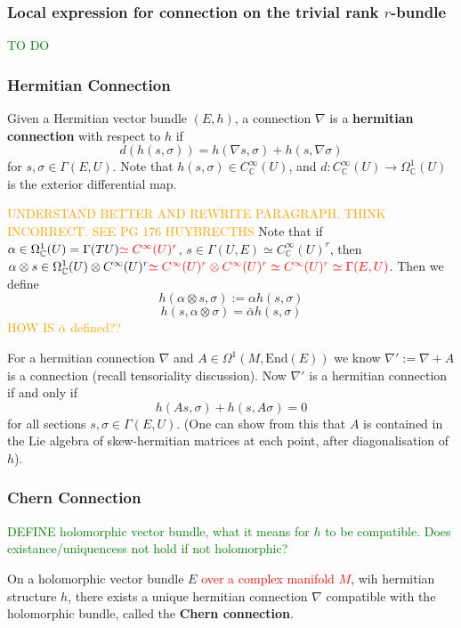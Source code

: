 \documentclass[a4paper]{article}
\theoremstyle{definition} \newtheorem*{definition}{Definition}
\theoremstyle{definition} \newtheorem*{definitions}{Definitions}
\theoremstyle{plain} \newtheorem{theorem}{Theorem}[section]
\theoremstyle{plain} \newtheorem{proposition}[theorem]{Proposition}
\theoremstyle{plain} \newtheorem{corollary}[theorem]{Corollary}
\theoremstyle{plain} \newtheorem{lemma}[theorem]{Lemma}
\theoremstyle{plain} \newtheorem{example}[theorem]{Example}
\newcommand{\checkCorrect}[1]{\textcolor{red}{#1}}
\newcommand{\understandBetter}[1]{\textcolor{orange}{#1}}
\newcommand{\question}[1]{\textcolor{orange}{#1}}
\newcommand{\finish}[1]{\textcolor{green}{#1}}
\newcommand{\defn}[1]{\textbf{#1}}
\newcommand{\complexnos}{\mathbb{C}}
\newcommand{\End}{\text{End}}
\newcommand{\smooth}{C^\infty}
\begin{document}
\subsubsection{Local expression for connection on the trivial rank $r$-bundle}
\finish{TO DO}

\subsubsection{Hermitian Connection}
Given a Hermitian vector bundle $(E, h)$, a connection $\nabla$ is a \defn{hermitian connection} with respect to $h$ if
$$d(h(s, \sigma))=h(\nabla s, \sigma)+h(s,\nabla\sigma)$$
for $s, \sigma\in \Gamma(E, U)$. Note that $h(s, \sigma)\in \smooth_\complexnos (U)$, and $d:\smooth_\complexnos (U)\to \Omega_\complexnos^1(U)$ is the exterior differential map.

\understandBetter{UNDERSTAND BETTER AND REWRITE PARAGRAPH. THINK INCORRECT. SEE PG 176 HUYBRECTHS}
Note that if $\alpha \in \Omega_\complexnos^1(U)=\Gamma(TU)\checkCorrect{\simeq \smooth(U)^r}$, $s\in \Gamma(U, E)\simeq \smooth_\complexnos (U)^r$, then $\alpha\otimes s\in \Omega_\complexnos^1(U) \otimes \smooth(U)^r \checkCorrect{\simeq \smooth(U)^r \otimes \smooth(U)^r \simeq \smooth(U)^r \simeq \Gamma(E, U)}$. Then we define 
$$h(\alpha \otimes s, \sigma):=\alpha h(s, \sigma)$$
$$h(s, \alpha \otimes \sigma) = \bar{\alpha}h(s, \sigma)$$
\question{HOW IS $\bar{\alpha}$ defined??}

For a hermitian connection $\nabla$ and $A\in \Omega^1(M, \End(E))$ we know $\nabla ' := \nabla + A$ is a connection (recall tensoriality discussion). Now $\nabla'$ is a hermitian connection if and only if
$$h(As, \sigma)+h(s, A\sigma)= 0$$
for all sections $s, \sigma \in \Gamma(E, U)$. (One can show from this that $A$ is contained in the Lie algebra of skew-hermitian matrices at each point, after  diagonalisation of $h$).

\subsubsection{Chern Connection}
\finish{DEFINE holomorphic vector bundle, what it means for $h$ to be compatible. Does existance/uniquencess not hold if not holomorphic? }

On a holomorphic vector bundle $E$ \checkCorrect{over a complex manifold $M$}, wih hermitian structure $h$, there exists a unique hermitian connection $\nabla$ compatible with the holomorphic bundle, called the \defn{Chern connection}. 
\end{document}
